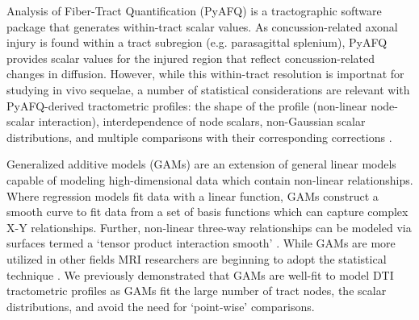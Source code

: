 \documentclass[12pt]{article}
\begin{document}
Analysis of Fiber-Tract Quantification (PyAFQ) \autocite{yeatman2012TractProfilesWhite,kruper2021EvaluatingReliabilityHuman,kruper2024TractometryHumanConnectome} is a tractographic software package that generates within-tract scalar values. As concussion-related axonal injury is found within a tract subregion (e.g. parasagittal splenium)\autocite{jang2020DiagnosticProblemsDiffuse,johnson2013AxonalPathologyTraumatic,lindsey2023DiffusionWeightedImagingMild}, PyAFQ provides scalar values for the injured region that reflect concussion-related changes in diffusion. However, while this within-tract resolution is importnat for studying in vivo sequelae, a number of statistical considerations are relevant with PyAFQ-derived tractometric profiles: the shape of the profile (non-linear node-scalar interaction), interdependence of node scalars, non-Gaussian scalar distributions, and multiple comparisons with their corresponding corrections \autocite{muncy2022GeneralAdditiveModels,richie-halford2021MultidimensionalAnalysisDetection}.

Generalized additive models (GAMs)\autocite{wood2017GeneralizedAdditiveModels,pedersen2019HierarchicalGeneralizedAdditive,stasinopoulos2008GeneralizedAdditiveModels} are an extension of general linear models capable of modeling high-dimensional data which contain non-linear relationships. Where regression models fit data with a linear function, GAMs construct a smooth curve to fit data from a set of basis functions which can capture complex X-Y relationships. Further, non-linear three-way relationships can be modeled via surfaces termed a `tensor product interaction smooth' \autocite{baayen2020IntroductionGeneralizedAdditive}. While GAMs are more utilized in other fields \autocite{simpson2018ModellingPalaeoecologicalTime,pedersen2019HierarchicalGeneralizedAdditive,schmidt2011SpatiallyExplicitHeight,wieling2011QuantitativeSocialDialectology,simpson2018ModellingPalaeoecologicalTime,wieling2018AnalyzingDynamicPhonetic,murase2009ApplicationGeneralizedAdditive,vanrij2019AnalyzingTimeCourse} MRI researchers are beginning to adopt the statistical technique \autocite{lee2025AtypicalMaturationFunctional,xu2025AgeBSASexspecific,wierenga2018UnravelingAgePuberty,mundo2022GeneralizedAdditiveModels,roy2025DevelopmentArcuateFasciculus,sorensen2021MetaanalysisGeneralizedAdditive,caffarra2024DevelopmentAlphaRhythm}. We previously demonstrated that GAMs are well-fit to model DTI tractometric profiles \autocite{muncy2022GeneralAdditiveModels} as GAMs fit the large number of tract nodes, the scalar distributions, and avoid the need for `point-wise' comparisons.
\end{document}
